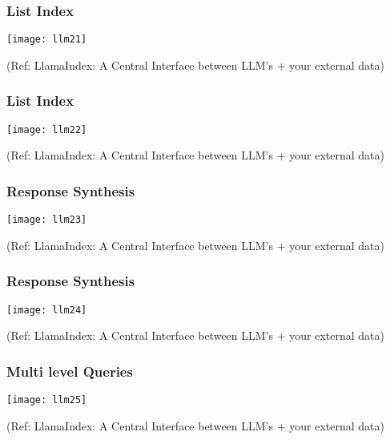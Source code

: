 \begin{frame}[fragile]\frametitle{List Index}

\begin{center}
\texttt{[image: llm21]}

{\tiny (Ref: LlamaIndex: A Central Interface between LLM's + your external data)}
\end{center}
\end{frame}

\begin{frame}[fragile]\frametitle{List Index}

\begin{center}
\texttt{[image: llm22]}

{\tiny (Ref: LlamaIndex: A Central Interface between LLM's + your external data)}
\end{center}
\end{frame}

\begin{frame}[fragile]\frametitle{Response Synthesis}

\begin{center}
\texttt{[image: llm23]}

{\tiny (Ref: LlamaIndex: A Central Interface between LLM's + your external data)}
\end{center}
\end{frame}

\begin{frame}[fragile]\frametitle{Response Synthesis}

\begin{center}
\texttt{[image: llm24]}

{\tiny (Ref: LlamaIndex: A Central Interface between LLM's + your external data)}
\end{center}
\end{frame}

\begin{frame}[fragile]\frametitle{Multi level Queries}

\begin{center}
\texttt{[image: llm25]}

{\tiny (Ref: LlamaIndex: A Central Interface between LLM's + your external data)}
\end{center}
\end{frame}


